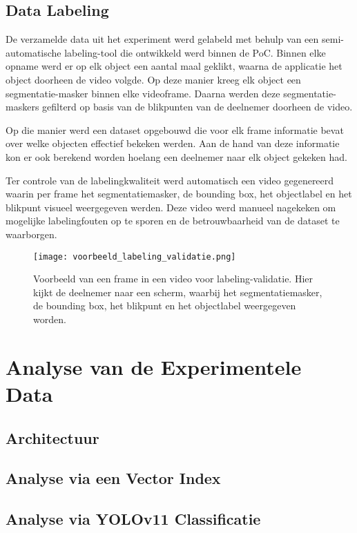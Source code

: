 \subsection{Data Labeling}

De verzamelde data uit het experiment werd gelabeld met behulp van een semi-automatische labeling-tool die ontwikkeld werd binnen de PoC.
Binnen elke opname werd er op elk object een aantal maal geklikt, waarna de applicatie het object doorheen de video volgde.
Op deze manier kreeg elk object een segmentatie-masker binnen elke videoframe.
Daarna werden deze segmentatie-maskers gefilterd op basis van de blikpunten van de deelnemer doorheen de video.

Op die manier werd een dataset opgebouwd die voor elk frame informatie bevat over welke objecten effectief bekeken werden.
Aan de hand van deze informatie kon er ook berekend worden hoelang een deelnemer naar elk object gekeken had.

Ter controle van de labelingkwaliteit werd automatisch een video gegenereerd waarin per frame het segmentatiemasker, de bounding box, het objectlabel en het blikpunt visueel weergegeven werden.
Deze video werd manueel nagekeken om mogelijke labelingfouten op te sporen en de betrouwbaarheid van de dataset te waarborgen.

\begin{figure}[H]
  \centering
  \texttt{[image: voorbeeld\_labeling\_validatie.png]}
  \caption[]{\label{fig:object-detection}Voorbeeld van een frame in een video voor labeling-validatie. Hier kijkt de deelnemer naar een scherm, waarbij het segmentatiemasker, de bounding box, het blikpunt en het objectlabel weergegeven worden.}
\end{figure}


\section{Analyse van de Experimentele Data}

\subsection{Architectuur}

\subsection{Analyse via een Vector Index}

\subsection{Analyse via YOLOv11 Classificatie}